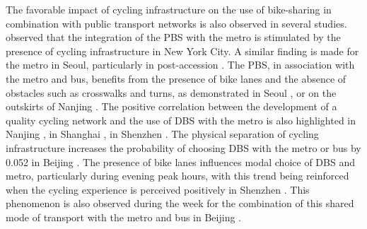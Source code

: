 \begin{refsegment}
The favorable impact of cycling infrastructure on the use of bike-sharing in combination with public transport networks is also observed in several studies. \textcolor{blue}{\textcite[932]{ashraf_impacts_2021}} observed that the integration of the \acrshort{PBS} with the metro is stimulated by the presence of cycling infrastructure in New York City. A similar finding is made for the metro in Seoul, particularly in post-accession \textcolor{blue}{\autocite[3111]{cho_estimation_2022}}. The \acrshort{PBS}, in association with the metro and bus, benefits from the presence of bike lanes and the absence of obstacles such as crosswalks and turns, as demonstrated in Seoul \textcolor{blue}{\autocite[9]{kim_analysis_2021}}, or on the outskirts of Nanjing \textcolor{blue}{\autocite[14]{ji_exploring_2018}}. The positive correlation between the development of a quality cycling network and the use of \acrshort{DBS} with the metro is also highlighted in Nanjing \textcolor{blue}{\autocite[9]{liu_use_2020}}, in Shanghai \textcolor{blue}{\autocite[29-30]{lin_analysis_2019}}, in Shenzhen \textcolor{blue}{\autocite[3]{wu_measuring_2019}}. The physical separation of cycling infrastructure increases the probability of choosing \acrshort{DBS} with the metro or bus by 0.052 in Beijing \textcolor{blue}{\autocite[7]{liu_mode_2022}}. The presence of bike lanes influences modal choice of \acrshort{DBS} and metro, particularly during evening peak hours, with this trend being reinforced when the cycling experience is perceived positively in Shenzhen \textcolor{blue}{\autocites[12]{guo_built_2020}[388]{guo_role_2021}[24]{guo_dockless_2021}}. This phenomenon is also observed during the week for the combination of this shared mode of transport with the metro and bus in Beijing \textcolor{blue}{\autocite[7]{zhou_spatially_2023}}.%


\end{refsegment}
